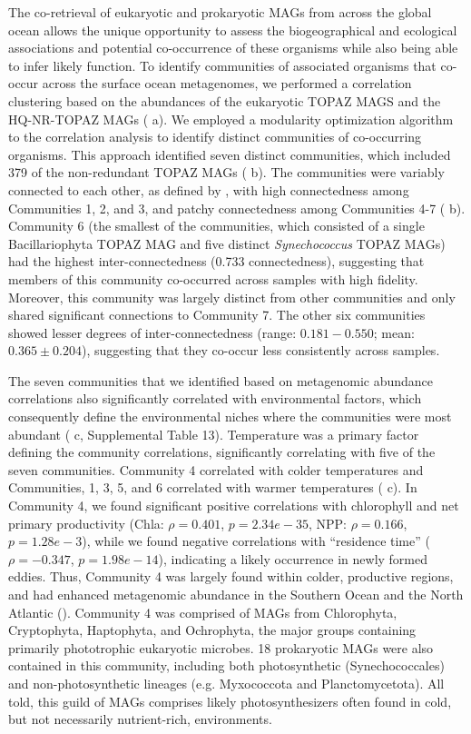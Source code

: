 \documentclass[12pt]{article}
\numberwithin{equation}{section}
\begin{document}
The co-retrieval of eukaryotic and prokaryotic MAGs from across the global ocean allows the unique opportunity to assess the biogeographical and ecological associations and potential co-occurrence of these organisms while also being able to infer likely function. To identify communities of associated organisms that co-occur across the surface ocean metagenomes, we performed a correlation clustering based on the abundances of the eukaryotic TOPAZ MAGS and the HQ-NR-TOPAZ MAGs ( a). We employed a modularity optimization algorithm to the correlation analysis \cite{blondel2008fast} to identify distinct communities of co-occurring organisms. This approach identified seven distinct communities, which included 379 of the non-redundant TOPAZ MAGs ( b). The communities were variably connected to each other, as defined by , with high connectedness among Communities 1, 2, and 3, and patchy connectedness among Communities 4-7 ( b). Community 6 (the smallest of the communities, which consisted of a single Bacillariophyta TOPAZ MAG and five distinct \textit{Synechococcus} TOPAZ MAGs) had the highest inter-connectedness (0.733 connectedness), suggesting that members of this community co-occurred across samples with high fidelity. Moreover, this community was largely distinct from other communities and only shared significant connections to Community 7. The other six communities showed lesser degrees of inter-connectedness (range: $0.181-0.550$; mean: $0.365\pm0.204$), suggesting that they co-occur less consistently across samples. 

The seven communities that we identified based on metagenomic abundance correlations also significantly correlated with environmental factors, which consequently define the environmental niches where the communities were most abundant ( c, Supplemental Table 13). Temperature was a primary factor defining the community correlations, significantly correlating with five of the seven communities. Community 4 correlated with colder temperatures and Communities, 1, 3, 5, and 6 correlated with warmer temperatures ( c). In Community 4, we found significant positive correlations with chlorophyll and net primary productivity (Chla: $\rho=0.401$, $p=2.34e-35$, NPP: $\rho=0.166$, $p=1.28e-3$), while we found negative correlations with ``residence time'' ($\rho=-0.347$, $p=1.98e-14$), indicating a likely occurrence in newly formed eddies. Thus, Community 4 was largely found within colder, productive regions, and had enhanced metagenomic abundance in the Southern Ocean and the North Atlantic (). Community 4 was comprised of MAGs from Chlorophyta, Cryptophyta, Haptophyta, and Ochrophyta, the major groups containing primarily phototrophic eukaryotic microbes. 18 prokaryotic MAGs were also contained in this community, including both photosynthetic (Synechococcales) and non-photosynthetic lineages (e.g. Myxococcota and Planctomycetota). All told, this guild of MAGs comprises likely photosynthesizers often found in cold, but not necessarily nutrient-rich, environments. 
\end{document}
